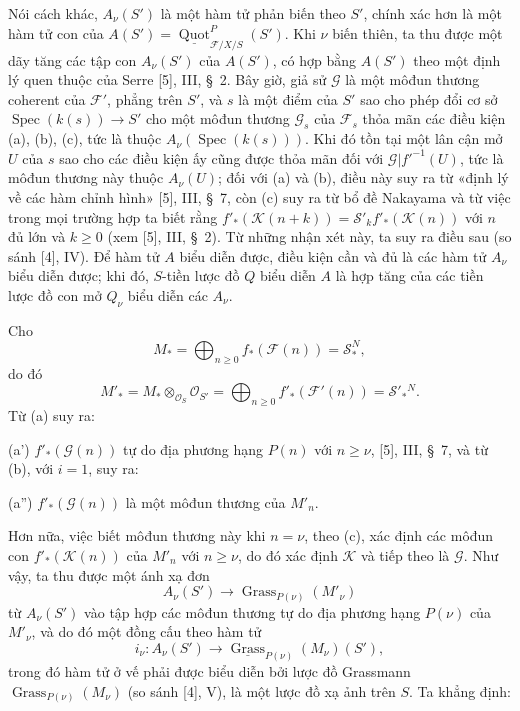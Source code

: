 Nói cách khác, $A_\nu(S')$ là một hàm tử phản biến theo $S'$, chính xác hơn là
một hàm tử con của
$A(S')=\underline{\operatorname{Quot}}^P_{\mathcal F/X/S}(S')$. Khi $\nu$
biến thiên, ta thu được một dãy tăng các tập con $A_\nu(S')$ của $A(S')$, có
hợp bằng $A(S')$ theo một định lý quen thuộc của Serre [5], III, \S~2. Bây giờ,
giả sử $\mathcal G$ là một môđun thương coherent của $\mathcal F'$, phẳng trên
$S'$, và $s$ là một điểm của $S'$ sao cho phép đổi cơ sở
$\operatorname{Spec}(k(s))\longrightarrow S'$ cho một môđun thương
$\mathcal G_s$ của $\mathcal F_s$ thỏa mãn các điều kiện (a), (b), (c), tức là
thuộc $A_\nu(\operatorname{Spec}(k(s)))$. Khi đó tồn tại một lân cận mở $U$
của $s$ sao cho các điều kiện ấy cũng được thỏa mãn đối với
$\mathcal G|f'^{-1}(U)$, tức là môđun thương này thuộc $A_\nu(U)$; đối với (a)
và (b), điều này suy ra từ «định lý về các hàm chỉnh hình» [5], III, \S~7, còn
(c) suy ra từ bổ đề Nakayama và từ việc trong mọi trường hợp ta biết rằng
$f'_*(\mathcal K(n+k))=\mathcal S'_k f'_*(\mathcal K(n))$
với $n$ đủ lớn và $k\geq0$ (xem [5], III, \S~2). Từ những nhận xét này, ta
suy ra điều sau (so sánh [4], IV). Để hàm tử $A$ biểu diễn được, điều kiện cần
và đủ là các hàm tử $A_\nu$ biểu diễn được; khi đó, $S$-tiền lược đồ $Q$ biểu
diễn $A$ là hợp tăng của các tiền lược đồ con mở $Q_\nu$ biểu diễn các
$A_\nu$.

Cho
\[
M_* =\bigoplus_{n\geq0}f_*(\mathcal F(n))=\mathcal S_*^{N},
\]
do đó
\[
M'_* =M_*\otimes_{\mathcal O_S}\mathcal O_{S'}
=\bigoplus_{n\geq0}f'_*(\mathcal F'(n))=\mathcal S'_*{}^{N}.
\]
Từ (a) suy ra:

\noindent (a') $f'_*(\mathcal G(n))$ tự do địa phương hạng $P(n)$ với
$n\geq\nu$, [5], III, \S~7, và từ (b), với $i=1$, suy ra:

\noindent (a'') $f'_*(\mathcal G(n))$ là một môđun thương của $M'_n$.

Hơn nữa, việc biết môđun thương này khi $n=\nu$, theo (c), xác định các môđun
con $f'_*(\mathcal K(n))$ của $M'_n$ với $n\geq\nu$, do đó xác định
$\mathcal K$ và tiếp theo là $\mathcal G$. Như vậy, ta thu được một ánh xạ đơn
\[
A_\nu(S')\longrightarrow\operatorname{Grass}_{P(\nu)}(M'_\nu)
\]
từ $A_\nu(S')$ vào tập hợp các môđun thương tự do địa phương hạng $P(\nu)$ của
$M'_\nu$, và do đó một đồng cấu theo hàm tử
\[
i_\nu:A_\nu(S')\longrightarrow
\underline{\operatorname{Grass}}_{P(\nu)}(M_\nu)(S'),
\]
trong đó hàm tử ở vế phải được biểu diễn bởi lược đồ Grassmann
$\operatorname{Grass}_{P(\nu)}(M_\nu)$ (so sánh [4], V), là một lược đồ xạ
ảnh trên $S$. Ta khẳng định:

